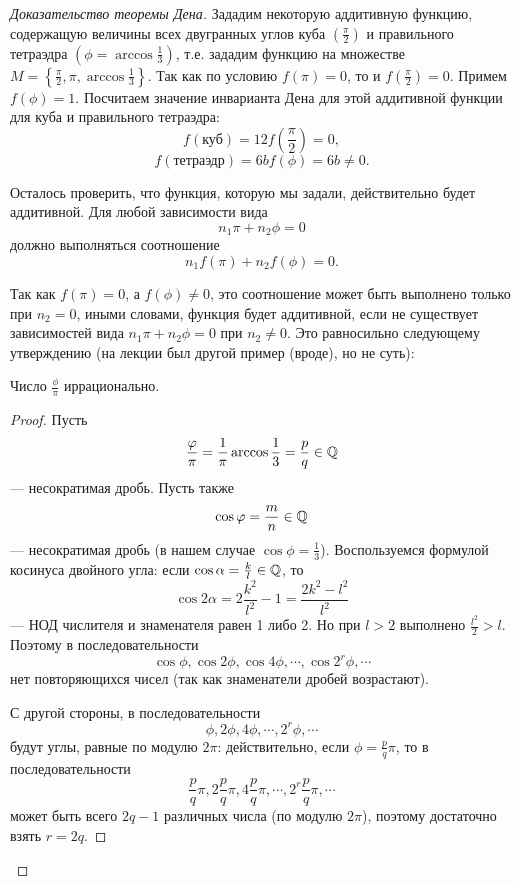 
\begin{proof}[Доказательство теоремы Дена]
    Зададим некоторую аддитивную функцию, содержащую величины всех двугранных углов куба $\left(\frac{\pi}{2}\right)$ и правильного тетраэдра $\left(\phi = \arccos{\frac{1}{3}}\right)$, т.е. зададим функцию на множестве $M = \left\{\frac{\pi}{2}, \pi, \arccos{\frac{1}{3}}\right\}$.
    Так как по условию $f(\pi) = 0$, то и $f(\frac{\pi}{2}) = 0$. Примем $f(\phi) = 1$. Посчитаем значение инварианта Дена для этой аддитивной функции для куба и правильного тетраэдра:
    \[f(\text{куб}) = 12 f\left(\frac{\pi}{2}\right) = 0,\]
    \[f(\text{тетраэдр}) = 6bf(\phi) = 6b \neq 0.\]

    Осталось проверить, что функция, которую мы задали, действительно будет аддитивной. Для любой зависимости вида $$n_1 \pi + n_2 \phi = 0$$ должно выполняться соотношение $$n_1 f(\pi) + n_2 f(\phi) = 0.$$

    Так как $f(\pi) = 0$, а $f(\phi) \neq 0$, это соотношение может быть выполнено только при $n_2 = 0$, иными словами, функция будет аддитивной, если не существует зависимостей вида $n_1 \pi + n_2 \phi = 0$ при $n_2 \neq 0$. Это равносильно следующему утверждению (на лекции был другой пример (вроде), но не суть):

    \begin{lemma}
        Число $\frac{\phi}{\pi}$ иррационально.
    \end{lemma} 
    \begin{proof}
        Пусть $$\frac{\varphi}{\pi} = \frac{1}{\pi} \arccos{\frac{1}{3}} = \frac{p}{q} \in \mathbb{Q}$$ — несократимая дробь.
        Пусть также $$\cos{\varphi} = \frac{m}{n} \in \mathbb{Q}$$ — несократимая дробь (в нашем случае $\cos{\phi} = \frac{1}{3}$).
        Воспользуемся формулой косинуса двойного угла: если $\cos{\alpha} = \frac{k}{l} \in \mathbb{Q}$, то
        $$\cos{2\alpha} = 2 \frac{k^2}{l^2} - 1 = \frac{2k^2 - l^2}{l^2}$$ — НОД числителя и знаменателя равен 1 либо 2. Но при $l > 2$ выполнено $\frac{l^2}{2} > l$. Поэтому в последовательности $$\cos{\phi}, \cos{2\phi}, \cos{4\phi}, \cdots, \cos{2^r \phi}, \cdots$$ нет повторяющихся чисел (так как знаменатели дробей возрастают).

        С другой стороны, в последовательности
        $$\phi, 2\phi, 4\phi, \cdots, 2^r \phi, \cdots$$
        будут углы, равные по модулю $2 \pi$: действительно, если $\phi = \frac{p}{q} \pi$, то в последовательности
        $$\frac{p}{q} \pi, 2 \frac{p}{q} \pi, 4 \frac{p}{q} \pi, \cdots, 2^r \frac{p}{q} \pi, \cdots$$
        может быть всего $2q - 1$ различных числа (по модулю $2 \pi$), поэтому достаточно взять $r = 2q$.


\end{proof}
\end{proof}
